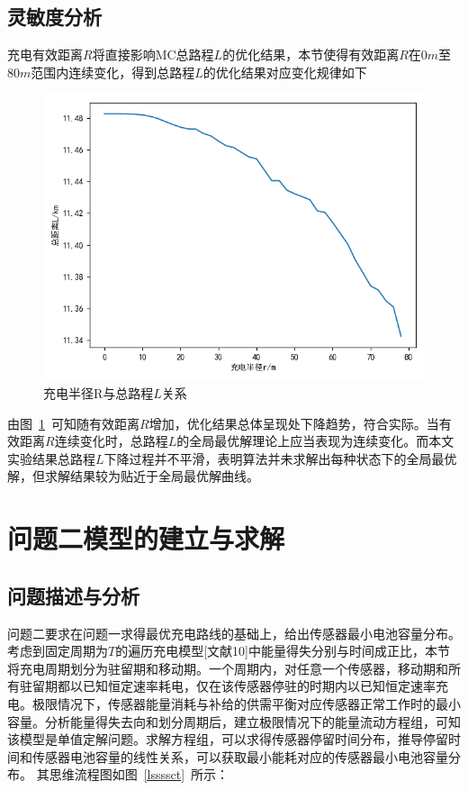 \documentclass{whutmod}
\begin{document}
	\subsection{灵敏度分析}
       充电有效距离$R$将直接影响MC总路程$L$的优化结果，本节使得有效距离$R$在$0m$至$80m$范围内连续变化，得到总路程$L$的优化结果对应变化规律如下
	    \begin{figure}[H]
		\centering
		\includegraphics[width=.8\textwidth]{figures/ssss.png}
		\caption{充电半径R与总路程$L$关系}\label{ssssssssssssss}
		\end{figure}
	由图~\ref{ssssssssssssss}~可知随有效距离$R$增加，优化结果总体呈现处下降趋势，符合实际。当有效距离$R$连续变化时，总路程$L$的全局最优解理论上应当表现为连续变化。而本文实验结果总路程$L$下降过程并不平滑，表明算法并未求解出每种状态下的全局最优解，但求解结果较为贴近于全局最优解曲线。
	\section{问题二模型的建立与求解}
		\subsection{问题描述与分析}

			问题二要求在问题一求得最优充电路线的基础上，给出传感器最小电池容量分布。考虑到固定周期为$T$的遍历充电模型[文献10]中能量得失分别与时间成正比，本节将充电周期划分为驻留期和移动期。一个周期内，对任意一个传感器，移动期和所有驻留期都以已知恒定速率耗电，仅在该传感器停驻的时期内以已知恒定速率充电。极限情况下，传感器能量消耗与补给的供需平衡对应传感器正常工作时的最小容量。分析能量得失去向和划分周期后，建立极限情况下的能量流动方程组，可知该模型是单值定解问题。求解方程组，可以求得传感器停留时间分布，推导停留时间和传感器电池容量的线性关系，可以获取最小能耗对应的传感器最小电池容量分布。
			其思维流程图如图~\ref{lssssct}~所示：
			
\end{document}
